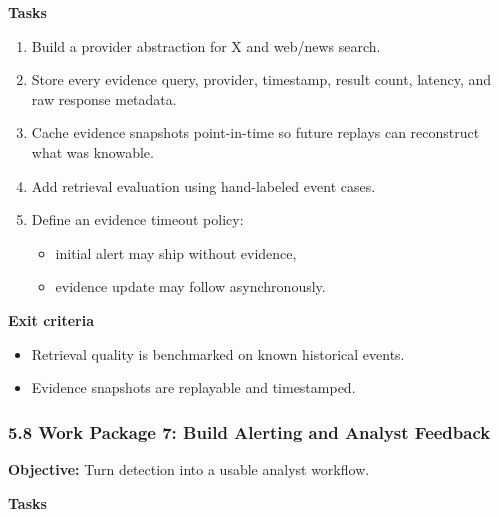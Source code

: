 \documentclass[
]{article}
\providecommand{\tightlist}{%
  \setlength{\itemsep}{0pt}\setlength{\parskip}{0pt}}
\begin{document}
\textbf{Tasks}

\begin{enumerate}
\def\labelenumi{\arabic{enumi}.}
\tightlist
\item
  Build a provider abstraction for X and web/news search.
\item
  Store every evidence query, provider, timestamp, result count,
  latency, and raw response metadata.
\item
  Cache evidence snapshots point-in-time so future replays can
  reconstruct what was knowable.
\item
  Add retrieval evaluation using hand-labeled event cases.
\item
  Define an evidence timeout policy:

  \begin{itemize}
  \tightlist
  \item
    initial alert may ship without evidence,
  \item
    evidence update may follow asynchronously.
  \end{itemize}
\end{enumerate}

\textbf{Exit criteria}

\begin{itemize}
\tightlist
\item
  Retrieval quality is benchmarked on known historical events.
\item
  Evidence snapshots are replayable and timestamped.
\end{itemize}

\subsubsection{5.8 Work Package 7: Build Alerting and Analyst
Feedback}\label{58-work-package-7-build-alerting-and-analyst-feedback}

\textbf{Objective:} Turn detection into a usable analyst workflow.

\textbf{Tasks}
\end{document}
